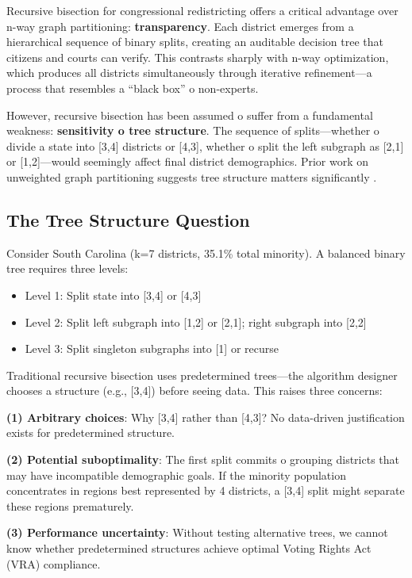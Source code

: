 Recursive bisection for congressional redistricting offers a critical advantage over n-way graph partitioning: \textbf{transparency}. Each district emerges from a hierarchical sequence of binary splits, creating an auditable decision tree that citizens and courts can verify. This contrasts sharply with n-way optimization, which produces all districts simultaneously through iterative refinement—a process that resembles a ``black box'' 	o non-experts.

However, recursive bisection has been assumed 	o suffer from a fundamental weakness: \textbf{sensitivity 	o tree structure}. The sequence of splits—whether 	o divide a state into [3,4] districts or [4,3], whether 	o split the left subgraph as [2,1] or [1,2]—would seemingly affect final district demographics. Prior work on unweighted graph partitioning suggests tree structure matters significantly \citep{karypis1998}.

\subsection{The Tree Structure Question}

Consider South Carolina (k=7 districts, 35.1\% total minority). A balanced binary tree requires three levels:
\begin{itemize}
\item Level 1: Split state into [3,4] or [4,3]
\item Level 2: Split left subgraph into [1,2] or [2,1]; right subgraph into [2,2]
\item Level 3: Split singleton subgraphs into [1] or recurse
\end{itemize}

Traditional recursive bisection uses predetermined trees—the algorithm designer chooses a structure (e.g., [3,4]) before seeing data. This raises three concerns:

\textbf{(1) Arbitrary choices}: Why [3,4] rather than [4,3]? No data-driven justification exists for predetermined structure.

\textbf{(2) Potential suboptimality}: The first split commits 	o grouping districts that may have incompatible demographic goals. If the minority population concentrates in regions best represented by 4 districts, a [3,4] split might separate these regions prematurely.

\textbf{(3) Performance uncertainty}: Without testing alternative trees, we cannot know whether predetermined structures achieve optimal Voting Rights Act (VRA) compliance.

